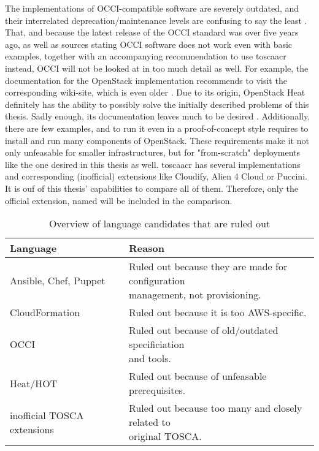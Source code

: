 \newline
The implementations of OCCI-compatible software are severely outdated, and their interrelated deprecation/maintenance levels are confusing to say the least \cite{occi_openstack} \cite{occi_opennebula} \cite{github_tmetsch_occi_os} \cite{github_stackforge_occi_os}.
That, and because the latest release of the OCCI standard was over five years ago, as well as sources stating OCCI software does not work even with basic examples, together with an accompanying recommendation to use \gls{toscaacr} instead, %
OCCI will not be looked at in too much detail as well. For example, the documentation for the OpenStack implementation \cite{occi_openstack} recommends to visit the corresponding wiki-site, which is even older \cite{openstack_occi}.
\newline
Due to its origin, OpenStack Heat definitely has the ability to possibly solve the initially described problems of this thesis. Sadly enough, its documentation leaves much to be desired \cite{openstack_heat}. Additionally, there are few examples, and to run it even in a proof-of-concept style requires to install and run many components of OpenStack. These requirements make it not only unfeasable for smaller infrastructures, but for "from-scratch" deployments like the one desired in this thesis as well.
\newline
\Gls{toscaacr} has several implementations and corresponding (inofficial) extensions like Cloudify, Alien 4 Cloud or Puccini. It is ouf of this thesis' capabilities to compare all of them. Therefore, only the official extension, named  will be included in the comparison.

\begin{table}[H]
  \caption{Overview of language candidates that are ruled out}
  \begin{tabular}{ | l | l | }
    \hline
    Language & Reason \\
    \hline
    Ansible, Chef, Puppet & \makecell{Ruled out because they are made for configuration \\ management, not provisioning.} \\
    \hline
    CloudFormation & Ruled out because it is too AWS-specific. \\
    \hline
    OCCI & \makecell{Ruled out because of old/outdated specificiation \\ and tools.} \\
    \hline
    Heat/HOT & Ruled out because of unfeasable prerequisites. \\
    \hline
    inofficial TOSCA extensions & \makecell{Ruled out because too many and closely related to \\ original TOSCA.} \\
    \hline
  \end{tabular}
  \label{tab:afterculling}
\end{table}

